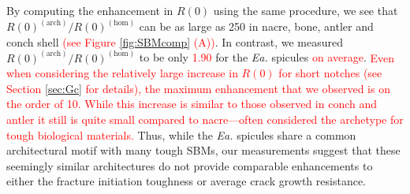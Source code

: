 \documentclass[12pt,onecolumn]{article}
\makeatletter
\newcommand{\EA}{\textit{Ea.\@}\xspace}
\makeatother
\begin{document}
\begin{bibunit}
By computing the enhancement in $R(0)$ using the same procedure, we see that $R(0)^{(\mathrm{arch})}/R(0)^{(\mathrm{hom})}$ can be as large as 250 in nacre, bone, antler and conch shell \textcolor{red}{(see Figure \ref{fig:SBMcomp} (A))}. In contrast, we measured $R(0)^{(\mathrm{arch})}/R(0)^{(\mathrm{hom})}$ to be only \textcolor{red}{1.90} for the \EA spicules \textcolor{red}{on average}. \textcolor{red}{Even when considering the relatively large increase in $R(0)$ for short notches (see Section \ref{sec:Gc} for details), the maximum enhancement that we observed is on the order of 10. While this increase is similar to those observed in conch and antler it still is quite small compared to nacre---often considered the archetype for tough biological materials.} Thus, while the \EA spicules share a common architectural motif with many tough SBMs, our measurements suggest that these seemingly similar architectures do not provide comparable enhancements to either the fracture initiation toughness or average crack growth resistance.


\end{bibunit}
\end{document}
